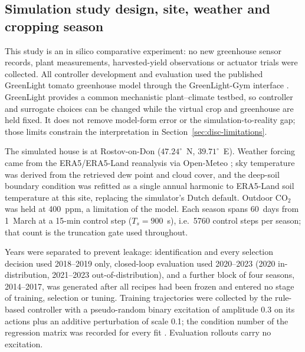 \subsection{Simulation study design, site, weather and cropping season}
\label{sec:sim}

This study is an in silico comparative experiment: no new greenhouse sensor records,
plant measurements, harvested-yield observations or actuator trials were collected. All
controller development and evaluation used the published GreenLight tomato greenhouse
model \cite{katzin2020,katzin2021} through the GreenLight-Gym interface
\cite{vanlaatum2025}. GreenLight provides a common mechanistic plant--climate testbed, so
controller and surrogate choices can be changed while the virtual crop and greenhouse are
held fixed. It does not remove model-form error or the simulation-to-reality gap; those
limits constrain the interpretation in Section~\ref{sec:disc-limitations}.

The simulated house is at Rostov-on-Don ($47.24^{\circ}$~N, $39.71^{\circ}$~E). Weather
forcing came from the ERA5/ERA5-Land reanalysis \cite{hersbach2020} via Open-Meteo
\cite{openmeteo2023}; sky temperature was derived from the retrieved dew point and cloud
cover, and the deep-soil boundary condition was refitted as a single annual harmonic to
ERA5-Land soil temperature at this site, replacing the simulator's Dutch default.
Outdoor CO$_2$ was held at 400~ppm, a limitation of the model. Each season spans
60~days from 1~March at a 15-min control step ($T_s=900$~s), i.e.\ 5760 control steps
per season; that count is the truncation gate used throughout.

Years were separated to prevent leakage: identification and
every selection decision used 2018--2019 only, closed-loop evaluation used 2020--2023 (2020 in-distribution,
2021--2023 out-of-distribution), and a further block of four seasons, 2014--2017, was
generated after all recipes had been frozen and entered no stage of training, selection
or tuning. Training trajectories were collected by the rule-based controller with a
pseudo-random binary excitation of amplitude 0.3 on its actions plus an additive
perturbation of scale 0.1; the condition number of the regression matrix was recorded
for every fit \cite{cortiella2021}. Evaluation rollouts carry no excitation.

